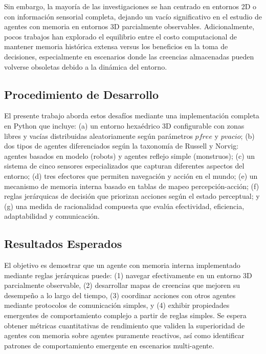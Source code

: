 \documentclass[10pt,twocolumn]{article}
\begin{document}
Sin embargo, la mayoría de las investigaciones se han centrado en entornos 2D o con información sensorial completa, dejando un vacío significativo en el estudio de agentes con memoria en entornos 3D parcialmente observables. Adicionalmente, pocos trabajos han explorado el equilibrio entre el costo computacional de mantener memoria histórica extensa versus los beneficios en la toma de decisiones, especialmente en escenarios donde las creencias almacenadas pueden volverse obsoletas debido a la dinámica del entorno.

\subsection{Procedimiento de Desarrollo}

El presente trabajo aborda estos desafíos mediante una implementación completa en Python que incluye: (a) un entorno hexaédrico 3D configurable con zonas libres y vacías distribuidas aleatoriamente según parámetros $pfree$ y $pvacio$; (b) dos tipos de agentes diferenciados según la taxonomía de Russell y Norvig: agentes basados en modelo (robots) y agentes reflejo simple (monstruos); (c) un sistema de cinco sensores especializados que capturan diferentes aspectos del entorno; (d) tres efectores que permiten navegación y acción en el mundo; (e) un mecanismo de memoria interna basado en tablas de mapeo percepción-acción; (f) reglas jerárquicas de decisión que priorizan acciones según el estado perceptual; y (g) una medida de racionalidad compuesta que evalúa efectividad, eficiencia, adaptabilidad y comunicación.

\subsection{Resultados Esperados}

El objetivo es demostrar que un agente con memoria interna implementado mediante reglas jerárquicas puede: (1) navegar efectivamente en un entorno 3D parcialmente observable, (2) desarrollar mapas de creencias que mejoren su desempeño a lo largo del tiempo, (3) coordinar acciones con otros agentes mediante protocolos de comunicación simples, y (4) exhibir propiedades emergentes de comportamiento complejo a partir de reglas simples. Se espera obtener métricas cuantitativas de rendimiento que validen la superioridad de agentes con memoria sobre agentes puramente reactivos, así como identificar patrones de comportamiento emergente en escenarios multi-agente.
\end{document}
